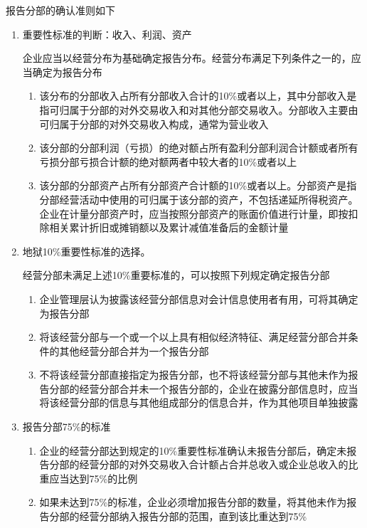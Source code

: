 \documentclass[UTF8,12pt]{ctexart}
\numberwithin{equation}{section} %
\numberwithin{figure}{section}
\numberwithin{table}{section}
\begin{document}
	报告分部的确认准则如下
	\begin{enumerate}
		\item 重要性标准的判断：收入、利润、资产
		
		企业应当以经营分布为基础确定报告分布。经营分布满足下列条件之一的，应当确定为报告分布
		\begin{enumerate}
			\item 该分布的分部收入占所有分部收入合计的10\%或者以上，其中分部收入是指可归属于分部的对外交易收入和对其他分部交易收入。分部收入主要由可归属于分部的对外交易收入构成，通常为营业收入
			
			\item 该分部的分部利润（亏损）的绝对额占所有盈利分部利润合计额或者所有亏损分部亏损合计额的绝对额两者中较大者的10\%或者以上
			
			\item 该分部的分部资产占所有分部资产合计额的10\%或者以上。分部资产是指分部经营活动中使用的可归属于该分部的资产，不包括递延所得税资产。企业在计量分部资产时，应当按照分部资产的账面价值进行计量，即按扣除相关累计折旧或摊销额以及累计减值准备后的金额计量
		\end{enumerate}
		
		\item 地狱10\%重要性标准的选择。
		
		经营分部未满足上述10\%重要标准的，可以按照下列规定确定报告分部
		\begin{enumerate}
			\item 企业管理层认为披露该经营分部信息对会计信息使用者有用，可将其确定为报告分部
			
			\item 将该经营分部与一个或一个以上具有相似经济特征、满足经营分部合并条件的其他经营分部合并为一个报告分部
			
			\item 不将该经营分部直接指定为报告分部，也不将该经营分部与其他未作为报告分部的经营分部合并未一个报告分部的，企业在披露分部信息时，应当将该经营分部的信息与其他组成部分的信息合并，作为其他项目单独披露
		\end{enumerate}
		
		\item 报告分部75\%的标准
		\begin{enumerate}
			\item 企业的经营分部达到规定的10\%重要性标准确认未报告分部后，确定未报告分部的经营分部的对外交易收入合计额占合并总收入或企业总收入的比重应当达到75\%的比例
			
			\item 如果未达到75\%的标准，企业必须增加报告分部的数量，将其他未作为报告分部的经营分部纳入报告分部的范围，直到该比重达到75\%
			

\end{enumerate}
\end{enumerate}
\end{document}
